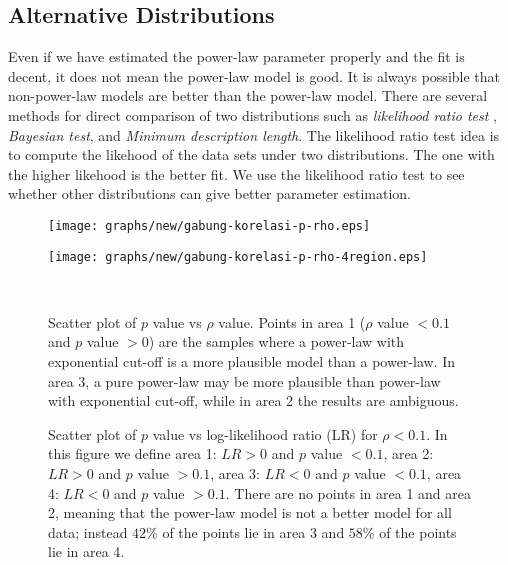 \documentclass[paper]{ieice}
\begin{document}
\subsection{Alternative Distributions}
Even if we have estimated the power-law parameter properly and the fit is decent, it does not mean the power-law model is good.
It is always possible that non-power-law models are better than the power-law model.
There are several methods for direct comparison of two distributions such as \textit{likelihood ratio test} \cite{vuong1989likelihood}, \textit{Bayesian test}, and \textit{Minimum description length}.
The likelihood ratio test idea is to compute the likehood of the data sets under two distributions. 
The one with the higher likehood is the better fit. 
We use the likelihood ratio test to see whether other distributions can give better parameter estimation.

\begin{figure*}[!tb]
\centering
\begin{minipage}[b]{.45\linewidth}
\centering
\texttt{[image: graphs/new/gabung-korelasi-p-rho.eps]}
\end{minipage}%
\hfill%
\begin{minipage}[b]{.45\linewidth}
\centering
\centering
\texttt{[image: graphs/new/gabung-korelasi-p-rho-4region.eps]}
\end{minipage}\\[-7pt]
\begin{minipage}[t]{.45\linewidth}
\caption{Scatter plot of $p$ value vs $\rho$ value. Points in area 1 ($\rho$ value $<0.1$ and $p$ value $>0$) are the samples where a power-law with exponential cut-off is a more plausible model than a power-law. In area 3, a pure power-law may be more plausible than power-law with exponential cut-off, while in area 2 the results are ambiguous.}
\label{fig:scatter-pvalue-vs-rho}
\end{minipage}%
\hfill%
\begin{minipage}[t]{.45\linewidth}
\caption{Scatter plot of $p$ value vs log-likelihood ratio (LR) for $\rho < 0.1$.
         In this figure we define area 1: $LR>0$ and $p$ value $<0.1$, area 2: $LR>0$ 
         and $p$ value $>0.1$, area 3: $LR<0$ and $p$ value $<0.1$, area 4: $LR<0$ and $p$ 
         value $>0.1$. There are no points in area 1 and area 2, meaning that the power-law
         model is not a better model for all data; instead $42\%$ of the points lie in area 3 
         and $58\%$ of the points lie in area 4.}
\label{fig:scatter-pvalue-vs-lr-for-rho-le-01}
\end{minipage}%
\vspace{-2mm}
\end{figure*}
\end{document}
